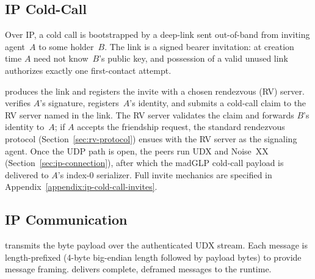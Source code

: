 \subsection{IP Cold-Call}
\label{sec:ip-cold-call}

Over IP, a cold call is bootstrapped by a deep-link sent out-of-band from inviting agent~$A$ to some holder~$B$.  The link is a signed bearer invitation: at creation time $A$ need not know~$B$'s public key, and possession of a valid unused link authorizes exactly one first-contact attempt.

 produces the link and registers the invite with a chosen rendezvous (RV) server.  verifies $A$'s signature, registers~$A$'s identity, and submits a cold-call claim to the RV server named in the link.  The RV server validates the claim and forwards $B$'s identity to~$A$; if $A$ accepts the friendship request, the standard rendezvous protocol (Section~\ref{sec:rv-protocol}) ensues with the RV server as the signaling agent.  Once the UDP path is open, the peers run UDX and Noise~XX (Section~\ref{sec:ip-connection}), after which the madGLP cold-call payload is delivered to $A$'s index-0 serializer.  Full invite mechanics are specified in Appendix~\ref{appendix:ip-cold-call-invites}.

\subsection{IP Communication}
\label{sec:ip-comm}
 transmits the byte payload over the authenticated UDX stream. Each message is length-prefixed (4-byte big-endian length followed by payload bytes) to provide message framing.  delivers complete, deframed messages to the runtime.
